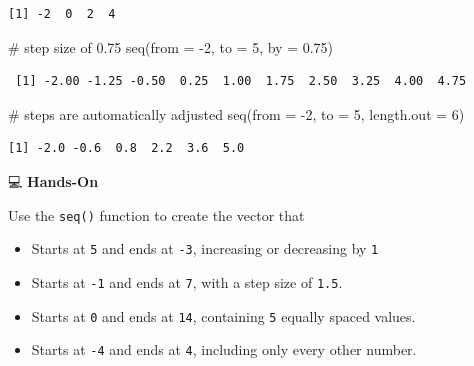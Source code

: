 \documentclass[
  letterpaper,
  DIV=11,
  numbers=noendperiod]{scrreprt}
\newenvironment{Shaded}{\begin{snugshade}}{\end{snugshade}}
\newcommand{\AttributeTok}[1]{\textcolor[rgb]{0.40,0.45,0.13}{#1}}
\newcommand{\CommentTok}[1]{\textcolor[rgb]{0.37,0.37,0.37}{#1}}
\newcommand{\DecValTok}[1]{\textcolor[rgb]{0.68,0.00,0.00}{#1}}
\newcommand{\FloatTok}[1]{\textcolor[rgb]{0.68,0.00,0.00}{#1}}
\newcommand{\FunctionTok}[1]{\textcolor[rgb]{0.28,0.35,0.67}{#1}}
\newcommand{\NormalTok}[1]{\textcolor[rgb]{0.00,0.23,0.31}{#1}}
\newcommand{\SpecialCharTok}[1]{\textcolor[rgb]{0.37,0.37,0.37}{#1}}
\begin{document}
\begin{verbatim}
[1] -2  0  2  4
\end{verbatim}

\begin{Shaded}
\begin{Highlighting}[]
\CommentTok{\# step size of 0.75}
\FunctionTok{seq}\NormalTok{(}\AttributeTok{from =} \SpecialCharTok{{-}}\DecValTok{2}\NormalTok{, }\AttributeTok{to =} \DecValTok{5}\NormalTok{, }\AttributeTok{by =} \FloatTok{0.75}\NormalTok{)         }
\end{Highlighting}
\end{Shaded}

\begin{verbatim}
 [1] -2.00 -1.25 -0.50  0.25  1.00  1.75  2.50  3.25  4.00  4.75
\end{verbatim}

\begin{Shaded}
\begin{Highlighting}[]
\CommentTok{\# steps are automatically adjusted}
\FunctionTok{seq}\NormalTok{(}\AttributeTok{from =} \SpecialCharTok{{-}}\DecValTok{2}\NormalTok{, }\AttributeTok{to =} \DecValTok{5}\NormalTok{, }\AttributeTok{length.out =} \DecValTok{6}\NormalTok{)    }
\end{Highlighting}
\end{Shaded}

\begin{verbatim}
[1] -2.0 -0.6  0.8  2.2  3.6  5.0
\end{verbatim}

💻 \textbf{Hands-On}

Use the \texttt{seq()} function to create the vector that

\begin{itemize}
\item
  Starts at \texttt{5} and ends at \texttt{-3}, increasing or decreasing
  by \texttt{1}
\item
  Starts at \texttt{-1} and ends at \texttt{7}, with a step size of
  \texttt{1.5}.
\item
  Starts at \texttt{0} and ends at \texttt{14}, containing \texttt{5}
  equally spaced values.
\item
  Starts at \texttt{-4} and ends at \texttt{4}, including only every
  other number.
\end{itemize}
\end{document}
